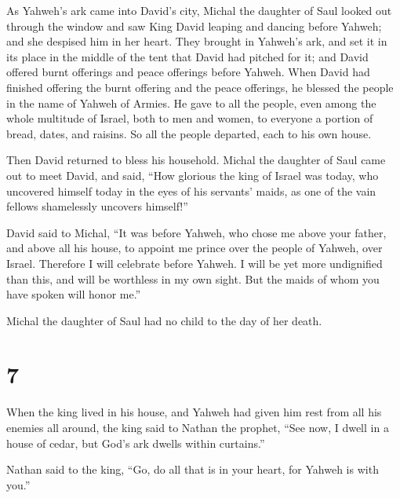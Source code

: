  As Yahweh's ark came into David's city, Michal the
daughter of Saul looked out through the window and saw King David
leaping and dancing before Yahweh; and she despised him in her heart.
 They brought in Yahweh's ark, and set it in its place in
the middle of the tent that David had pitched for it; and David offered
burnt offerings and peace offerings before Yahweh.  When
David had finished offering the burnt offering and the peace offerings,
he blessed the people in the name of Yahweh of Armies. 
He gave to all the people, even among the whole multitude of Israel,
both to men and women, to everyone a portion of bread, dates, and
raisins. So all the people departed, each to his own house.

 Then David returned to bless his household. Michal the
daughter of Saul came out to meet David, and said, ``How glorious the
king of Israel was today, who uncovered himself today in the eyes of his
servants' maids, as one of the vain fellows shamelessly uncovers
himself!''

 David said to Michal, ``It was before Yahweh, who chose
me above your father, and above all his house, to appoint me prince over
the people of Yahweh, over Israel. Therefore I will celebrate before
Yahweh.  I will be yet more undignified than this, and
will be worthless in my own sight. But the maids of whom you have spoken
will honor me.''

 Michal the daughter of Saul had no child to the day of
her death.

\hypertarget{section-6}{%
\section{7}\label{section-6}}

 When the king lived in his house, and Yahweh had given
him rest from all his enemies all around,  the king said
to Nathan the prophet, ``See now, I dwell in a house of cedar, but God's
ark dwells within curtains.''

 Nathan said to the king, ``Go, do all that is in your
heart, for Yahweh is with you.''

